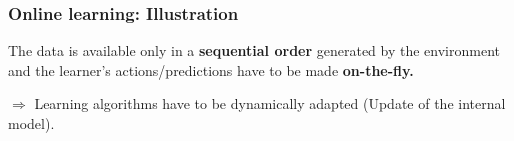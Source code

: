 \documentclass[11pt,compress,t,notes=noshow, xcolor=table]{beamer}
\begin{document}
\begin{frame}
\frametitle{Online learning: Illustration}
\small
%	
{ The data is available only in a \textbf{sequential order} generated by the environment and the learner's actions/predictions have to be made \textbf{on-the-fly.}}
%

{ {$\Rightarrow $ Learning algorithms have to be dynamically adapted (Update of the internal model).\\~} }
 
{}
{}
{}

\end{frame}
\end{document}
